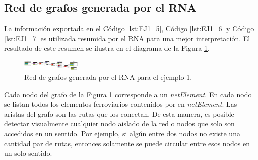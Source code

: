 \subsection{Red de grafos generada por el RNA}

 	La información exportada en el Código \ref{lst:EJ1_5}, Código \ref{lst:EJ1_6} y Código \ref{lst:EJ1_7} es utilizada resumida por el RNA para una mejor interpretación. El resultado de este resumen se ilustra en el diagrama de la Figura \ref{fig:EJ1_8}.

	\begin{figure}[H]
		\centering
		\includegraphics[angle = 90, origin = c, width=0.25\textwidth]{Figuras/Graph_1}
		\centering\caption{Red de grafos generada por el RNA para el ejemplo 1.}
		\label{fig:EJ1_8}
	\end{figure}
	
	Cada nodo del grafo de la Figura \ref{fig:EJ1_8} corresponde a un \textit{netElement}. En cada nodo se listan todos los elementos ferroviarios contenidos por en \textit{netElement}. Las aristas del grafo son las rutas que los conectan. De esta manera, es posible detectar visualmente cualquier nodo aislado de la red o nodos que solo son accedidos en un sentido. Por ejemplo, si algún entre dos nodos no existe una cantidad par de rutas, entonces solamente se puede circular entre esos nodos en un solo sentido.